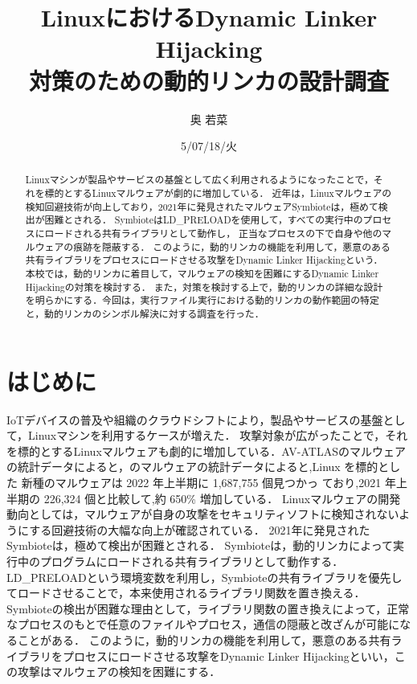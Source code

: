 \documentclass[submit,techreq,noauthor,dvipdfmx]{mid-eco}
\begin{document}
\date   {5/07/18/火}				%
\title  {LinuxにおけるDynamic Linker Hijacking\\対策のための動的リンカの設計調査}	%
\author {奥 若菜}				%


\begin{abstract}
	Linuxマシンが製品やサービスの基盤として広く利用されるようになったことで，それを標的とするLinuxマルウェアが劇的に増加している．
  近年は，Linuxマルウェアの検知回避技術が向上しており，2021年に発見されたマルウェアSymbioteは，極めて検出が困難とされる．
  SymbioteはLD\_PRELOADを使用して，すべての実行中のプロセスにロードされる共有ライブラリとして動作し，
  正当なプロセスの下で自身や他のマルウェアの痕跡を隠蔽する．
  このように，動的リンカの機能を利用して，悪意のある共有ライブラリをプロセスにロードさせる攻撃をDynamic Linker Hijackingという．
  本校では，動的リンカに着目して，マルウェアの検知を困難にするDynamic Linker Hijackingの対策を検討する．
  また，対策を検討する上で，動的リンカの詳細な設計を明らかにする．今回は，実行ファイル実行における動的リンカの動作範囲の特定と，動的リンカのシンボル解決に対する調査を行った．
\end{abstract}
\maketitle


\section{はじめに}
IoTデバイスの普及や組織のクラウドシフトにより，製品やサービスの基盤として，Linuxマシンを利用するケースが増えた．
攻撃対象が広がったことで，それを標的とするLinuxマルウェアも劇的に増加している．AV-ATLASのマルウェアの統計データによると，のマルウェアの統計データによると,Linux を標的とした
新種のマルウェアは 2022 年上半期に 1,687,755 個見つかっ
ており,2021 年上半期の 226,324 個と比較して,約 650\%
増加している\cite{AV-TEST}．
Linuxマルウェアの開発動向としては，マルウェアが自身の攻撃をセキュリティソフトに検知されないようにする回避技術の大幅な向上が確認されている\cite{IBM}．
2021年に発見されたSymbioteは，極めて検出が困難とされる\cite{Symbiote}．
Symbioteは，動的リンカによって実行中のプログラムにロードされる共有ライブラリとして動作する．
LD\_PRELOADという環境変数を利用し，Symbioteの共有ライブラリを優先してロードさせることで，本来使用されるライブラリ関数を置き換える．
Symbioteの検出が困難な理由として，ライブラリ関数の置き換えによって，正常なプロセスのもとで任意のファイルやプロセス，通信の隠蔽と改ざんが可能になることがある．
このように，動的リンカの機能を利用して，悪意のある共有ライブラリをプロセスにロードさせる攻撃をDynamic Linker Hijackingといい，この攻撃はマルウェアの検知を困難にする．
\end{document}
